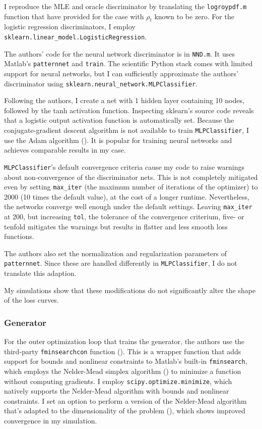 I reproduce the MLE and oracle discriminator by translating the \texttt{logroypdf.m} function that \textcite{kaji2023adversarial} have provided for the case with $\rho_t$ known to be zero.
For the logistic regression discriminators, I employ \texttt{sklearn.linear\_model.LogisticRegression}.

The authors' code for the neural network discriminator is in \texttt{NND.m}.
It uses Matlab's \texttt{patternnet} and \texttt{train}.
The scientific Python stack comes with limited support for neural networks, but I can sufficiently approximate the authors' discriminator using \texttt{sklearn.neural\_network.MLPClassifier}.

Following the authors, I create a net with 1 hidden layer containing 10 nodes, followed by the tanh activation function.
Inspecting sklearn's source code reveals that a logistic output activation function is automatically set. %
Because the conjugate-gradient descent algorithm is not available to train \texttt{MLPClassifier}, I use the Adam algorithm (\textcite{diederik2014adam}).
It is popular for training neural networks and achieves comparable results in my case. %

\texttt{MLPClassifier}'s default convergence criteria cause my code to raise warnings about non-convergence of the discriminator nets.
This is not completely mitigated even by setting \texttt{max\_iter} (the maximum number of iterations of the optimizer) to 2000 (10 times the default value), at the cost of a longer runtime. %
Nevertheless, the networks converge well enough under the default settings. %
Leaving \texttt{max\_iter} at 200, but increasing \texttt{tol}, the tolerance of the convergence criterium, five- or tenfold mitigates the warnings but results in flatter and less smooth loss functions. %

The authors also set the normalization and regularization parameters of \texttt{patternnet}.
Since these are handled differently in \texttt{MLPClassifier}, I do not translate this adaption.

My simulations show that these modifications do not significantly alter the shape of the loss curves. %

\subsubsection{Generator}

For the outer optimization loop that trains the generator, the authors use the third-party \mbox{\texttt{fminsearchcon}} function (\textcite{DErrico2024}).
This is a wrapper function that adds support for bounds and nonlinear constraints to Matlab's built-in \texttt{fminsearch}, which employs the Nelder-Mead simplex algorithm (\textcite{lagarias1998convergence}) to minimize a function without computing gradients.
I employ \texttt{scipy.optimize.minimize}, which natively supports the Nelder-Mead algorithm with bounds and nonlinear constraints.
I set an option to perform a version of the Nelder-Mead algorithm that's adapted to the dimensionality of the problem (\cite{gao2012implementing}), which shows improved convergence in my simulation. %

